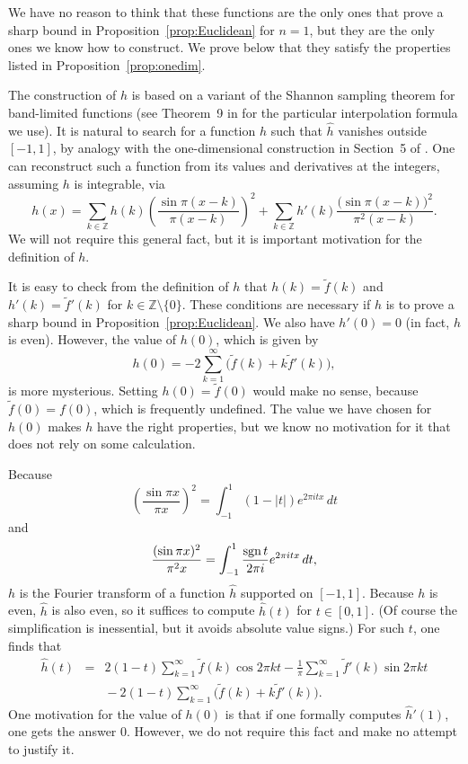 \documentclass{jams-l}
\theoremstyle{plain}
\numberwithin{theorem}{section}
\theoremstyle{definition}
\numberwithin{equation}{section}
\newcommand{\Z}{{\mathbb Z}}
\newcommand{\sgn}{\mathop{\textup{sgn}}}
\newcommand{\ft}{\widetilde{f}}
\begin{document}
We have no reason to think that these functions are the only ones
that prove a sharp bound in Proposition~\ref{prop:Euclidean} for
$n=1$, but they are the only ones we know how to construct.   We
prove below that they satisfy the properties listed in
Proposition~\ref{prop:onedim}.

The construction of $h$ is based on a variant of the Shannon
sampling theorem for band-limited functions (see Theorem~9 in
\cite{V} for the particular interpolation formula we use).  It is
natural to search for a function $h$ such that $\widehat{h}$
vanishes outside $[-1,1]$, by analogy with the one-dimensional
construction in Section~5 of \cite{CE}.  One can reconstruct such
a function from its values and derivatives at the integers,
assuming $h$ is integrable, via
$$
h(x) = \sum_{k \in \Z} h(k) \left(\frac{\sin \pi(x-k)}{\pi
(x-k)}\right)^2 + \sum_{k \in \Z} h'(k) \frac{\big(\sin
\pi(x-k)\big)^2}{\pi^2(x-k)}.
$$
We will not require this general fact, but it is important
motivation for the definition of $h$.

It is easy to check from the definition of $h$ that $h(k) =
\ft(k)$ and $h'(k) = \ft'(k)$ for $k \in \Z \setminus \{0\}$.
These conditions are necessary if $h$ is to prove a sharp bound in
Proposition~\ref{prop:Euclidean}.  We also have $h'(0)=0$ (in
fact, $h$ is even).  However, the value of $h(0)$, which is given
by
$$
h(0) = - 2 \sum_{k=1}^\infty \big(\ft(k) + k \ft'(k)\big),
$$
is more mysterious.  Setting $h(0)=\ft(0)$ would make no sense,
because $\ft(0)=f(0)$, which is frequently undefined.  The value
we have chosen for $h(0)$ makes $h$ have the right properties, but
we know no motivation for it that does not rely on some
calculation.

Because
$$
\left(\frac{\sin \pi x}{\pi x}\right)^2 = \int_{-1}^1 (1-|t|)
e^{2\pi i t x}\, dt
$$
and
$$
\frac{(\sin \pi x)^2}{\pi^2 x} = \int_{-1}^1 \frac{\sgn t}{2\pi i}
e^{2\pi i t x} \, dt,
$$
$h$ is the Fourier transform of a function $\widehat{h}$ supported
on $[-1,1]$.  Because $h$ is even, $\widehat{h}$ is also even, so
it suffices to compute $\widehat{h}(t)$ for $t \in [0,1]$.  (Of
course the simplification is inessential, but it avoids absolute
value signs.)  For such $t$, one finds that
\begin{eqnarray*}
\widehat{h}(t) &=& 2(1-t) \sum_{k=1}^\infty \ft(k) \cos 2\pi k t
- \frac{1}{\pi} \sum_{k=1}^\infty \ft'(k) \sin 2 \pi k t\\
&& \phantom{} - 2 (1-t) \sum_{k=1}^\infty \big(\ft(k) + k
\ft'(k)\big).
\end{eqnarray*}
One motivation for the value of $h(0)$ is that if one formally
computes $\widehat{h}'(1)$, one gets the answer $0$.  However, we
do not require this fact and make no attempt to justify it.
\end{document}
